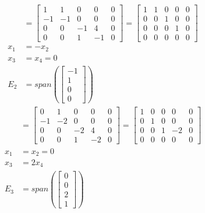 \documentclass{math}
\begin{document}
\begin{align*}
  [A-2I|0] &= \begin{bmatrix}
    1 & 1 & 0 & 0 & 0 \\
    -1 & -1 & 0 & 0 & 0 \\
    0 & 0 & -1 & 4 & 0 \\
    0 & 0 & 1 & -1 & 0
  \end{bmatrix} = \begin{bmatrix}
    1 & 1 & 0 & 0 & 0 \\
    0 & 0 & 1 & 0 & 0 \\
    0 & 0 & 0 & 1 & 0 \\
    0 & 0 & 0 & 0 & 0
  \end{bmatrix} \\
  x_1 &= -x_2 \\
  x_3 &= x_4 = 0 \\
  E_2 &= span\left(\begin{bmatrix}-1 \\ 1 \\ 0 \\ 0\end{bmatrix}\right)
\end{align*}
\begin{align*}
  [A-3I|0] &= \begin{bmatrix}
    0 & 1 & 0 & 0 & 0 \\
    -1 & -2 & 0 & 0 & 0 \\
    0 & 0 & -2 & 4 & 0 \\
    0 & 0 & 1 & -2 & 0
  \end{bmatrix} = \begin{bmatrix}
    1 & 0 & 0 & 0 & 0 \\
    0 & 1 & 0 & 0 & 0 \\
    0 & 0 & 1 & -2 & 0 \\
    0 & 0 & 0 & 0 & 0
  \end{bmatrix} \\
  x_1 &= x_2 = 0 \\
  x_3 &= 2x_4 \\
  E_3 &= span\left(\begin{bmatrix}0 \\ 0 \\ 2 \\ 1\end{bmatrix}\right)
\end{align*}
\end{document}
